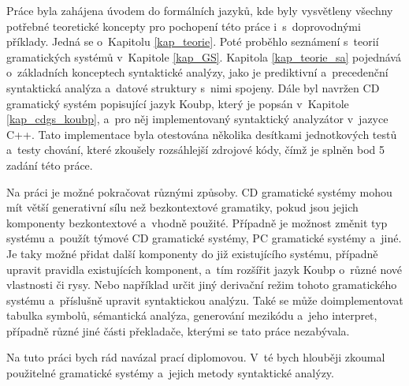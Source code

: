 Práce byla zahájena úvodem do formálních jazyků, kde byly vysvětleny všechny potřebné teoretické koncepty pro pochopení této práce i~s~doprovodnými příklady.
Jedná se o~Kapitolu \ref{kap_teorie}.
Poté proběhlo seznámení s~teorií gramatických systémů v~Kapitole \ref{kap_GS}.
Kapitola \ref{kap_teorie_sa} pojednává o~základních konceptech syntaktické analýzy, jako je prediktivní a~precedenční syntaktická analýza a~datové struktury s~nimi spojeny.
Dále byl navržen CD gramatický systém popisující jazyk Koubp, který je popsán v~Kapitole \ref{kap_cdgs_koubp}, a~pro něj implementovaný syntaktický analyzátor v~jazyce C++.
Tato implementace byla otestována několika desítkami jednotkových testů a~testy chování, které zkoušely rozsáhlejší zdrojové kódy, čímž je splněn bod 5 zadání této práce.

Na práci je možné pokračovat různými způsoby.
CD gramatické systémy mohou mít větší generativní sílu než bezkontextové gramatiky, pokud jsou jejich komponenty bezkontextové a~vhodně použité.
Případně je možnost změnit typ systému a~použít týmové CD gramatické systémy, PC gramatické systémy a~jiné.
Je taky možné přidat další komponenty do již existujícího systému, případně upravit pravidla existujících komponent, a~tím rozšířit jazyk Koubp o~různé nové vlastnosti či rysy.
Nebo například určit jiný derivační režim tohoto gramatického systému a~příslušně upravit syntaktickou analýzu.
Také se může doimplementovat tabulka symbolů, sémantická analýza, generování mezikódu a~jeho interpret, případně různé jiné části překladače, kterými se tato práce nezabývala.

Na tuto práci bych rád navázal prací diplomovou.
V~té bych hlouběji zkoumal použitelné gramatické systémy a~jejich metody syntaktické analýzy.

